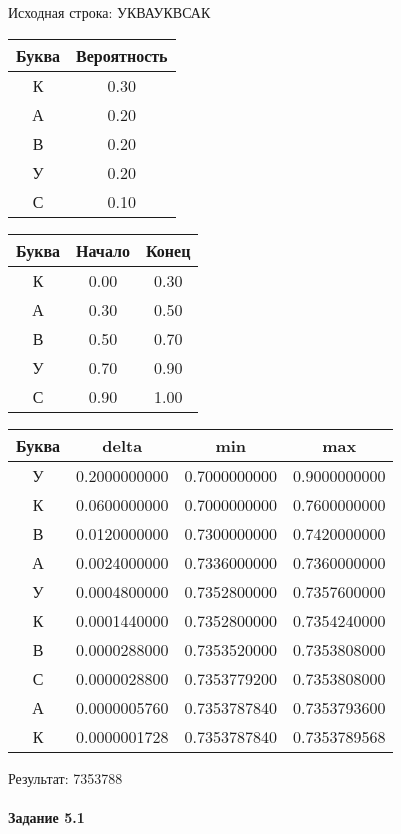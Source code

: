 \documentclass[a4paper, 12pt]{article}
\begin{document}
Исходная строка: УКВАУКВСАК\
\begin{center}
 \begin{tabular}{ |c|c| } 
  \hline
     Буква & Вероятность \\ \hline
К & 0.30\\\hline
А & 0.20\\\hline
В & 0.20\\\hline
У & 0.20\\\hline
С & 0.10
\\ \hline \end{tabular}
\end{center}
\begin{center}
 \begin{tabular}{ |c|c|c| } 
  \hline
     Буква & Начало & Конец \\ \hline
К & 0.00 & 0.30\\\hline
А & 0.30 & 0.50\\\hline
В & 0.50 & 0.70\\\hline
У & 0.70 & 0.90\\\hline
С & 0.90 & 1.00
\\ \hline \end{tabular}
\end{center}
\begin{center}
 \begin{tabular}{ |c|c|c|c| } 
  \hline
     Буква & delta & min & max \\ \hline
У & 0.2000000000 & 0.7000000000 & 0.9000000000\\\hline
К & 0.0600000000 & 0.7000000000 & 0.7600000000\\\hline
В & 0.0120000000 & 0.7300000000 & 0.7420000000\\\hline
А & 0.0024000000 & 0.7336000000 & 0.7360000000\\\hline
У & 0.0004800000 & 0.7352800000 & 0.7357600000\\\hline
К & 0.0001440000 & 0.7352800000 & 0.7354240000\\\hline
В & 0.0000288000 & 0.7353520000 & 0.7353808000\\\hline
С & 0.0000028800 & 0.7353779200 & 0.7353808000\\\hline
А & 0.0000005760 & 0.7353787840 & 0.7353793600\\\hline
К & 0.0000001728 & 0.7353787840 & 0.7353789568
\\ \hline \end{tabular}
\end{center}
Результат: 7353788
\pagebreak
\paragraph{Задание 5.1}
\end{document}
